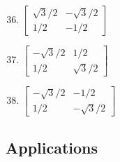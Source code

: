 \documentclass{article}
\begin{document}
\begin{enumerate}
	      \setcounter{enumi}{35}
	\item $\begin{bmatrix}\sqrt{3}/2 & -\sqrt{3}/2 \\ 1/2 & -1/2\end{bmatrix}$
	\item $\begin{bmatrix}-\sqrt{3}/2 & 1/2 \\ 1/2 & \sqrt{3}/2\end{bmatrix}$
	      \setcounter{enumi}{38}
	\item $\begin{bmatrix}-\sqrt{3}/2 & -1/2 \\ 1/2 & -\sqrt{3}/2\end{bmatrix}$
\end{enumerate}

\subsection{Applications}
\end{document}
